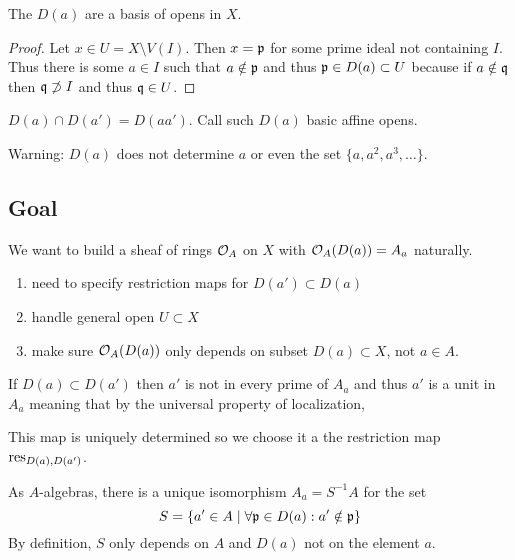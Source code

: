 \documentclass[12pt]{article}
\begin{document}
\begin{prop}
The $D(a)$ are a basis of opens in $X$.
\end{prop}

\begin{proof}
Let $x \in U = X \setminus V(I)$. Then $x = \mathfrak{p}$ for some prime ideal not containing $I$. Thus there is some $a \in I$ such that $a \notin \mathfrak{p}$ and thus $\mathfrak{p} \in D(a) \subset U$ because if $a \notin \mathfrak{q}$ then $\mathfrak{q} \not\supset I$ and thus $\mathfrak{q} \in U$. 
\end{proof}

\begin{rmk}
$D(a) \cap D(a') = D(aa')$. Call such $D(a)$ basic affine opens. 
\end{rmk}

\begin{rmk}
Warning: $D(a)$ does not determine $a$ or even the set $\{ a, a^2, a^3, \dots \}$.
\end{rmk}

\subsection{Goal}

We want to build a sheaf of rings $\mathcal{O}_{A}$ on $X$ with $\mathcal{O}_{A}(D(a)) = A_a$ naturally. 

\begin{enumerate}
\item need to specify restriction maps for $D(a') \subset D(a)$
\item handle general open $U \subset X$
\item make sure $\mathcal{O}_{A}(D(a))$ only depends on subset $D(a) \subset X$, not $a \in A$.
\end{enumerate}

If $D(a) \subset D(a')$ then $a'$ is not in every prime of $A_a$ and thus $a'$ is a unit in $A_a$ meaning that by the universal property of localization,
\begin{center}
\end{center}
This map is uniquely determined so we choose it a the restriction map $\mathrm{res}_{D(a), D(a')}$. 

\begin{prop}
As $A$-algebras, there is a unique isomorphism $A_a = S^{-1} A$ for the set
\[ S = \{ a' \in A \mid \forall \mathfrak{p} \in D(a) : a' \notin \mathfrak{p} \} \]
By definition, $S$ only depends on $A$ and $D(a)$ not on the element $a$.
\end{prop}
\end{document}
